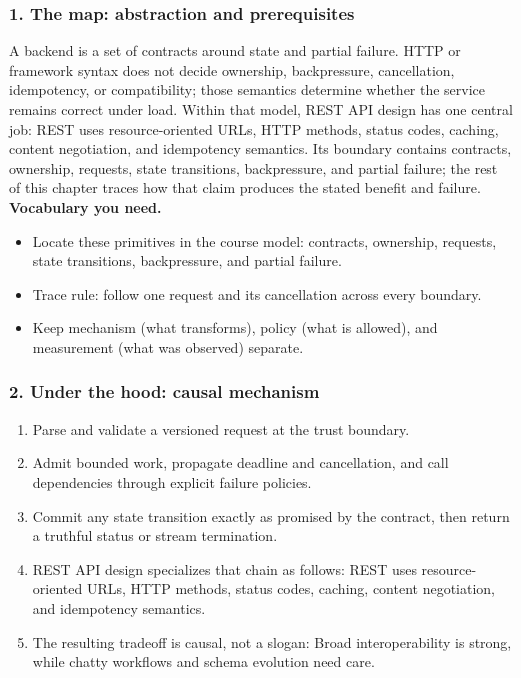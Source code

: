 \subsubsection*{1. The map: abstraction and prerequisites}
A backend is a set of contracts around state and partial failure. HTTP or framework syntax does not decide ownership, backpressure, cancellation, idempotency, or compatibility; those semantics determine whether the service remains correct under load.
Within that model, REST API design has one central job: REST uses resource-oriented URLs, HTTP methods, status codes, caching, content negotiation, and idempotency semantics. Its boundary contains contracts, ownership, requests, state transitions, backpressure, and partial failure; the rest of this chapter traces how that claim produces the stated benefit and failure.
\textbf{Vocabulary you need.}\begin{itemize}
\item Locate these primitives in the course model: contracts, ownership, requests, state transitions, backpressure, and partial failure.
\item Trace rule: follow one request and its cancellation across every boundary.
\item Keep mechanism (what transforms), policy (what is allowed), and measurement (what was observed) separate.
\end{itemize}
\subsubsection*{2. Under the hood: causal mechanism}\begin{enumerate}
\item Parse and validate a versioned request at the trust boundary.
\item Admit bounded work, propagate deadline and cancellation, and call dependencies through explicit failure policies.
\item Commit any state transition exactly as promised by the contract, then return a truthful status or stream termination.
\item REST API design specializes that chain as follows: REST uses resource-oriented URLs, HTTP methods, status codes, caching, content negotiation, and idempotency semantics.
\item The resulting tradeoff is causal, not a slogan: Broad interoperability is strong, while chatty workflows and schema evolution need care.
\end{enumerate}
